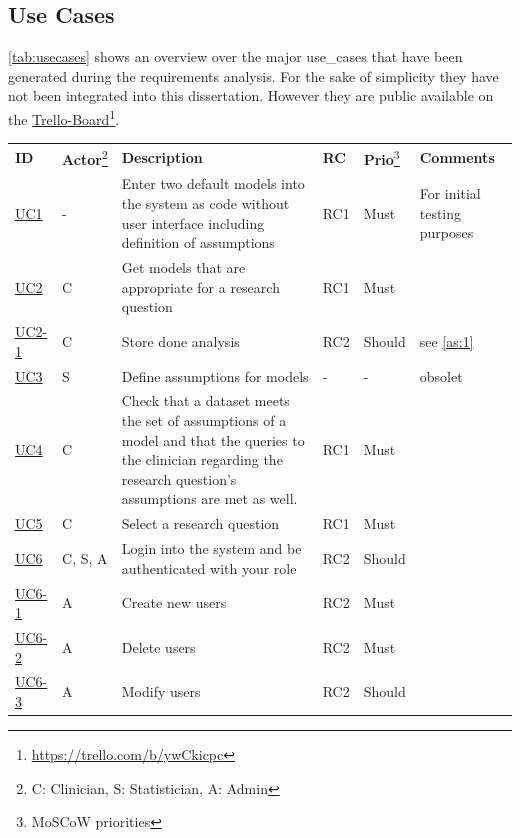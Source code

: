 \subsection{Use Cases}
\label{sub:use_cases}
\autoref{tab:usecases} shows an overview over the major \glspl{use_case} that have been generated during the requirements analysis. For the sake of simplicity they have not been integrated into this dissertation. However they are public available on the \href{https://trello.com/b/ywCkicpc}{Trello-Board}\footnote{\url{https://trello.com/b/ywCkicpc}}.

\begin{landscape}
	\begin{longtable}{ l l p{10.5cm} l l p{3cm} }
		\textbf{ID}                         & \textbf{\Gls{Actor}}\footnote{C: Clinician, S: Statistician, A: Admin} &\textbf{Description} &  \textbf{RC} & \textbf{Prio}\footnote{MoSCoW priorities} &  \textbf{Comments}\\
		\href{https://trello.com/c/KEOokZp9}{UC1}   & 	- & 	Enter two default models into the system as code without user interface including definition of assumptions & RC1 & Must &  For initial testing purposes  \\
		\href{https://trello.com/c/ebVrFdA5}{UC2}   & 	C & 	Get models that are appropriate for a research question & RC1	& Must &	   \\
		\href{https://trello.com/c/ORRBjISQ}{UC2-1} & 	C & 	Store done analysis & RC2 & Should &  see \autoref{as:1} \\
		\href{https://trello.com/c/qKLAoWRj}{UC3} 	&  	S & 	Define assumptions for models & - & - & obsolet \\
		\href{https://trello.com/c/7NINsfz8}{UC4}   & 	C & 	Check that a dataset meets the set of assumptions of a model and that the queries to the clinician regarding the research question's  assumptions are met as well. & RC1 & Must   &   \\
		\href{https://trello.com/c/22JGne3r}{UC5}   & 	C & 	Select a research question & RC1 & Must &   \\
		\href{https://trello.com/c/CVGBVWID}{UC6}   &   C, S, A & 	Login into the system and be authenticated with your role & RC2 & Should &	 \\
		\href{https://trello.com/c/pId27kJM}{UC6-1} &   A & 	Create new users & RC2 & Must &	 \\
		\href{https://trello.com/c/pQ98qgSL}{UC6-2} &  	A & 	Delete users & RC2 & Must	 &   \\
		\href{https://trello.com/c/mvxBeNSR}{UC6-3} &  	A & 	Modify users & RC2 & Should &   \\

\end{longtable}
\end{landscape}
